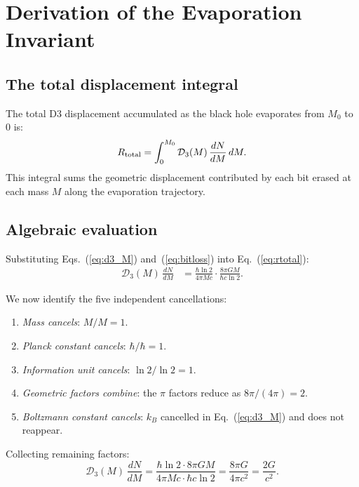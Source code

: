 \documentclass[aps,prd,twocolumn,showpacs,preprintnumbers,amsmath,amssymb,longbibliography]{revtex4-2}
\begin{document}
\section{Derivation of the Evaporation Invariant}
\label{sec:derivation}

\subsection{The total displacement integral}

The total D3 displacement accumulated as the black hole evaporates from $M_0$ to $0$ is:
\begin{equation}
R_{\rm total} = \int_0^{M_0} \mathcal{D}_3(M)\, \frac{dN}{dM}\, dM.
\label{eq:rtotal}
\end{equation}
This integral sums the geometric displacement contributed by each bit erased at each 
mass $M$ along the evaporation trajectory.

\subsection{Algebraic evaluation}

Substituting Eqs.~(\ref{eq:d3_M}) and~(\ref{eq:bitloss}) into Eq.~(\ref{eq:rtotal}):
\begin{align}
\mathcal{D}_3(M)\, \frac{dN}{dM} 
&= \frac{\hbar \ln 2}{4\pi M c} \cdot \frac{8\pi G M}{\hbar c \ln 2}.
\label{eq:integrand_full}
\end{align}

We now identify the five independent cancellations:
\begin{enumerate}
\item \textit{Mass cancels}: $M/M = 1$.
\item \textit{Planck constant cancels}: $\hbar/\hbar = 1$.
\item \textit{Information unit cancels}: $\ln 2/\ln 2 = 1$.
\item \textit{Geometric factors combine}: the $\pi$ factors reduce as $8\pi/(4\pi) = 2$.
\item \textit{Boltzmann constant cancels}: $k_B$ cancelled in Eq.~(\ref{eq:d3_M}) and does not reappear.
\end{enumerate}

Collecting remaining factors:
\begin{equation}
\mathcal{D}_3(M)\, \frac{dN}{dM} 
= \frac{\hbar \ln 2 \cdot 8\pi G M}{4\pi M c \cdot \hbar c \ln 2}
= \frac{8\pi G}{4\pi c^2}
= \frac{2G}{c^2}.
\label{eq:integrand_simplified}
\end{equation}
\end{document}
